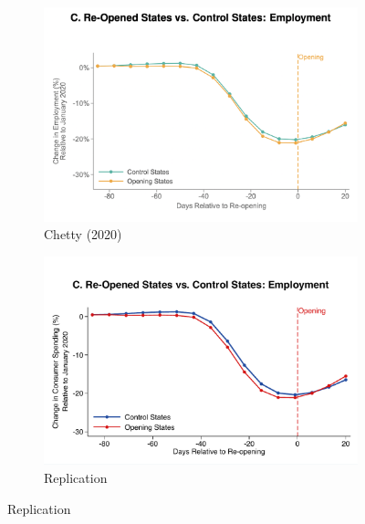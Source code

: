 \documentclass[12pt,letterpaper]{article}
\begin{document}
\clearpage

\begin{figure}
    \centering
    \caption{}
    \begin{subfigure}[t]{0.8\textwidth}
        \centering
        \includegraphics[width=\linewidth]{ChettyEmploymentGraph.png} 
        \caption{Chetty (2020)} 
        \label{fig:empC}
    \end{subfigure}

    \begin{subfigure}[t]{0.8\textwidth}
        \centering
        \includegraphics[width=\linewidth]{EmploymentGraph.pdf} 
        \caption{Replication} 
        \label{fig:emp}
    \end{subfigure}
\end{figure}

\clearpage
\end{document}
